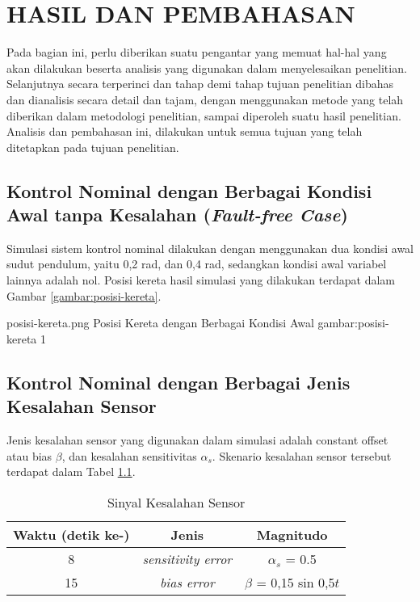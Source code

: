 \chapter{HASIL DAN PEMBAHASAN}

Pada bagian ini, perlu diberikan suatu pengantar yang memuat hal-hal yang akan dilakukan beserta analisis yang digunakan dalam menyelesaikan penelitian. Selanjutnya secara terperinci dan tahap demi tahap tujuan penelitian dibahas dan dianalisis secara detail dan tajam, dengan menggunakan metode yang telah diberikan dalam metodologi penelitian, sampai diperoleh suatu hasil penelitian. Analisis dan pembahasan ini, dilakukan untuk semua tujuan yang telah ditetapkan pada tujuan penelitian.

\section{Kontrol Nominal dengan Berbagai Kondisi Awal tanpa Kesalahan (\textit{Fault-free Case})}

Simulasi sistem kontrol nominal dilakukan dengan menggunakan dua kondisi awal sudut pendulum, yaitu 0,2 rad, dan 0,4 rad, sedangkan kondisi awal variabel lainnya adalah nol. Posisi kereta hasil simulasi yang dilakukan terdapat dalam Gambar \ref{gambar:posisi-kereta}.

\gambar
    {posisi-kereta.png}
    {Posisi Kereta dengan Berbagai Kondisi Awal}
    {gambar:posisi-kereta}
    {1}

\section{Kontrol Nominal dengan Berbagai Jenis Kesalahan Sensor}

Jenis kesalahan sensor yang digunakan dalam simulasi adalah constant offset atau bias $\beta$, dan kesalahan sensitivitas $\alpha_s$. Skenario kesalahan sensor tersebut terdapat dalam Tabel \ref{tabel:sinyal-kesalahan}.

\begin{table}[H]
    \caption{Sinyal Kesalahan Sensor}
    \centering
    \begin{tabular}{ ccc }
        \toprule
        Waktu (detik ke-) & Jenis & Magnitudo \\
        \midrule
        8 & \textit{sensitivity error} & $\alpha_s$ = 0.5 \\
        15 & \textit{bias error} & $\beta$ = 0,15 sin 0,5$t$ \\
        \bottomrule
    \end{tabular}
    \label{tabel:sinyal-kesalahan}
\end{table}